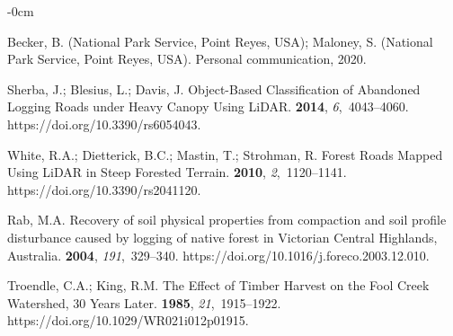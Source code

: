 \documentclass[remotesensing,article,accept,pdftex,moreauthors]{Definitions/mdpi}
\begin{document}
\begin{adjustwidth}{-\extralength}{0cm}





\begin{thebibliography}{999}

Becker, B. (National Park Service, Point Reyes, USA); %
Maloney, S.  (National Park Service, Point Reyes, USA). %
\newblock Personal communication, %
2020. 



Sherba, J.; Blesius, L.; Davis, J.
\newblock Object-Based Classification of Abandoned Logging Roads under Heavy
  Canopy Using LiDAR.
 {\bf 2014}, {\em
  6},~4043--4060.
\newblock https://doi.org/10.3390/rs6054043.

White, R.A.; Dietterick, B.C.; Mastin, T.; Strohman, R.
\newblock Forest Roads Mapped Using LiDAR in Steep Forested Terrain.
 {\bf 2010}, {\em
  2},~1120--1141.
\newblock https://doi.org/10.3390/rs2041120.

Rab, M.A.
\newblock Recovery of soil physical properties from compaction and soil profile
  disturbance caused by logging of native forest in Victorian Central
  Highlands, Australia.
 {\bf 2004}, {\em 191},~329--340.
\newblock https://doi.org/10.1016/j.foreco.2003.12.010.

Troendle, %
 C.A.; King, R.M.
\newblock The Effect of Timber Harvest on the Fool Creek Watershed, 30 Years
  Later.
 {\bf 1985}, {\em 21},~1915--1922. https://doi.org/10.1029/WR021i012p01915.


\end{thebibliography}
\end{adjustwidth}
\end{document}
